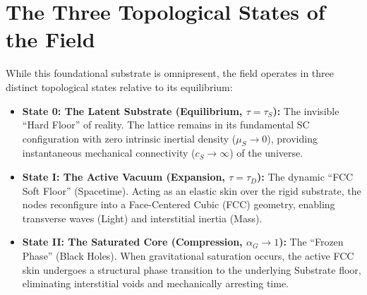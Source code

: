 \section{The Three Topological States of the Field}
While this foundational substrate is omnipresent, the field operates in three distinct topological states relative to its equilibrium:
\begin{itemize}
    \item \textbf{State 0: The Latent Substrate (Equilibrium, $\tau = \tau_S$):} The invisible ``Hard Floor'' of reality. The lattice remains in its fundamental SC configuration with zero intrinsic inertial density ($\mu_S \to 0$), providing instantaneous mechanical connectivity ($c_S \to \infty$) of the universe.
    \item \textbf{State I: The Active Vacuum (Expansion, $\tau = \tau_D$):} The dynamic ``FCC Soft Floor'' (Spacetime). Acting as an elastic skin over the rigid substrate, the nodes reconfigure into a Face-Centered Cubic (FCC) geometry, enabling transverse waves (Light) and interstitial inertia (Mass).
    \item \textbf{State II: The Saturated Core (Compression, $\alpha_G \to 1$):} The ``Frozen Phase'' (Black Holes). When gravitational saturation occurs, the active FCC skin undergoes a structural phase transition to the underlying Substrate floor, eliminating interstitial voids and mechanically arresting time.
\end{itemize}
